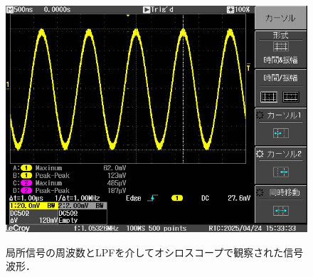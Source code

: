 \documentclass[uplatex,dvipdfmx,a4j,12pt]{jsarticle}
\begin{document}
\begin{figure}[H]
\begin{minipage}
      \label{fig:4-3-b}
  \end{minipage}
  \begin{minipage}
      [b]{0.45\linewidth}
      \centering
      \includegraphics[width=\linewidth]{img/4_3_11MHz.jpg}
      \label{fig:4-3-c}
  \end{minipage}
  \caption{局所信号の周波数とLPFを介してオシロスコープで観察された信号波形．}
  \label{fig:4-3}
\end{figure}
\end{document}
